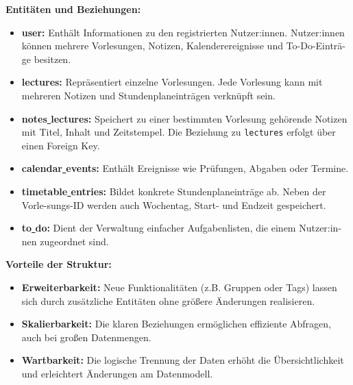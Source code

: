 \textbf{Entitäten und Beziehungen:}
\begin{itemize}
    \item \textbf{user:} Enthält Informationen zu den registrierten Nutzer:innen. Nutzer:innen können mehrere Vorlesungen, Notizen, Kalenderereignisse und To-Do-Einträ-ge besitzen.
    
    \item \textbf{lectures:} Repräsentiert einzelne Vorlesungen. Jede Vorlesung kann mit mehreren Notizen und Stundenplaneinträgen verknüpft sein.
    
    \item \textbf{notes\underline{ }lectures:} Speichert zu einer bestimmten Vorlesung gehörende Notizen mit Titel, Inhalt und Zeitstempel. Die Beziehung zu \texttt{lectures} erfolgt über einen Foreign Key.
    
    \item \textbf{calendar\underline{ }events:} Enthält Ereignisse wie Prüfungen, Abgaben oder Termine.
    
    \item \textbf{timetable\underline{ }entries:} Bildet konkrete Stundenplaneinträge ab. Neben der Vorle-sungs-ID werden auch Wochentag, Start- und Endzeit gespeichert.
    
    \item \textbf{to\underline{ }do:} Dient der Verwaltung einfacher Aufgabenlisten, die einem Nutzer:in-nen zugeordnet sind.
\end{itemize}
\textbf{Vorteile der Struktur:}
\begin{itemize}
    \item \textbf{Erweiterbarkeit:} Neue Funktionalitäten (z.B. Gruppen oder Tags) lassen sich durch zusätzliche Entitäten ohne größere Änderungen realisieren.
    \item \textbf{Skalierbarkeit:} Die klaren Beziehungen ermöglichen effiziente Abfragen, auch bei großen Datenmengen.
    \item \textbf{Wartbarkeit:} Die logische Trennung der Daten erhöht die Übersichtlichkeit und erleichtert Änderungen am Datenmodell.
\end{itemize}

